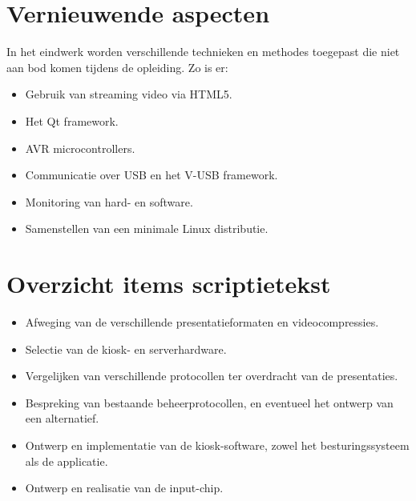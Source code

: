 \documentclass[a4paper,oneside,11pt,final]{memoir}
\begin{document}
\section{Vernieuwende aspecten}

In het eindwerk worden verschillende technieken en methodes toegepast die niet aan bod komen tijdens de opleiding. Zo is er:
\begin{itemize}
\item Gebruik van streaming video via HTML5.
\item Het Qt framework.
\item AVR microcontrollers.
\item Communicatie over USB en het V-USB framework.
\item Monitoring van hard- en software.
\item Samenstellen van een minimale Linux distributie.
\end{itemize}


\section{Overzicht items scriptietekst}

\begin{itemize}
\item Afweging van de verschillende presentatieformaten en videocompressies.
\item Selectie van de kiosk- en serverhardware.
\item Vergelijken van verschillende protocollen ter overdracht van de presentaties.
\item Bespreking van bestaande beheerprotocollen, en eventueel het ontwerp van een alternatief.
\item Ontwerp en implementatie van de kiosk-software, zowel het besturingssysteem als de applicatie.
\item Ontwerp en realisatie van de input-chip.
\end{itemize}
\end{document}
